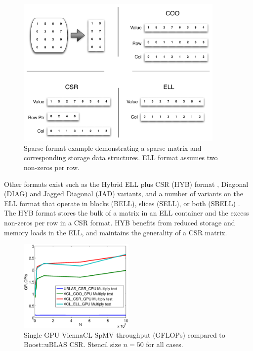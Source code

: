 \documentclass{report}
\begin{document}
\begin{figure}
\centering
\includegraphics[width=0.9\textwidth]{gpu_content/omnigraffle/SparseStorage.pdf}
\caption{Sparse format example demonstrating a sparse matrix and corresponding storage data structures. ELL format assumes two non-zeros per row. }
\label{fig:sparse_format}
\end{figure}


Other formats exist such as the Hybrid ELL plus CSR (HYB) format \cite{Bell2009}, Diagonal (DIAG) and Jagged Diagonal (JAD) variants, and a number of variants on the ELL format that operate in blocks (BELL), slices (SELL), or both (SBELL) \cite{SuKeutzer2012}. The HYB format stores the bulk of a matrix in an ELL container and the excess non-zeros per row in a CSR format. HYB benefits from reduced storage and memory loads in the ELL, and maintains the generality of a CSR matrix. 

\begin{figure}
\centering
\includegraphics[width=0.5\textwidth]{../figures/spmv/spmv_vcl_gflops.eps}
\caption{Single GPU ViennaCL SpMV throughput (GFLOPs) compared to Boost::uBLAS CSR. Stencil size $n=50$ for all cases.}
\label{fig:spmv_vcl_gflops}
\end{figure}
\end{document}
